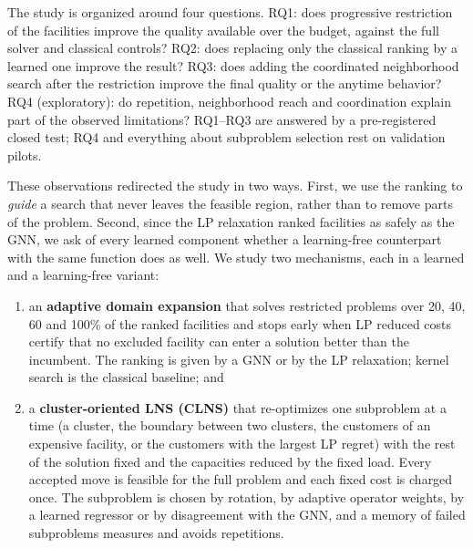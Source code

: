 The study is organized around four questions. RQ1: does progressive restriction of the
facilities improve the quality available over the budget, against the full solver and classical
controls? RQ2: does replacing only the classical ranking by a learned one improve the result?
RQ3: does adding the coordinated neighborhood search after the restriction improve the final
quality or the anytime behavior? RQ4 (exploratory): do repetition, neighborhood reach and
coordination explain part of the observed limitations? RQ1--RQ3 are answered by a pre-registered
closed test; RQ4 and everything about subproblem selection rest on validation pilots.

These observations redirected the study in two ways. First, we use the ranking to \emph{guide} a
search that never leaves the feasible region, rather than to remove parts of the problem.
Second, since the LP relaxation ranked facilities as safely as the GNN, we ask of every learned
component whether a learning-free counterpart with the same function does as well. We study two
mechanisms, each in a learned and a learning-free variant:
\begin{enumerate}
\item an \textbf{adaptive domain expansion} that solves restricted problems over 20, 40, 60 and
100\% of the ranked facilities and stops early when LP reduced costs certify that no excluded
facility can enter a solution better than the incumbent. The ranking is given by a GNN or by the
LP relaxation; kernel search \citep{guastaroba2014} is the classical baseline; and
\item a \textbf{cluster-oriented LNS (CLNS)} that re-optimizes one subproblem at a time (a
cluster, the boundary between two clusters, the customers of an expensive facility, or the
customers with the largest LP regret) with the rest of the solution fixed and the capacities
reduced by the fixed load. Every accepted move is feasible for the full problem and each fixed
cost is charged once. The subproblem is chosen by rotation, by adaptive operator weights, by a
learned regressor or by disagreement with the GNN, and a memory of failed subproblems measures
and avoids repetitions.
\end{enumerate}

